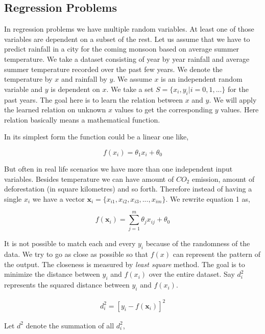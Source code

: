 \documentclass[english]{tktltiki}
\begin{document}
\subsection{Regression Problems}
\label{subsec:reg_prob}

In regression problems we have multiple random variables. At least one of those variables are dependent on a subset of the rest. Let us assume that we have to predict rainfall in a city for the coming monsoon based on average summer temperature. We take a dataset consisting of year by year rainfall and average summer temperature recorded over the past few years. We denote the temperature by $x$ and rainfall by $y$. We assume $x$ is an independent random variable and $y$ is dependent on $x$. We take a set $S = \{x_i, y_i|i = 0, 1, ...\}$ for the past years. The goal here is to learn the relation between $x$ and $y$. We will apply the learned relation on unknown $x$ values to get the corresponding $y$ values. Here relation basically means a mathematical function.

In its simplest form the function could be a linear one like,

\begin{equation}
f(x_i) = \theta_1 x_i + \theta_0
\end{equation}


But often in real life scenarios we have more than one independent input variables. Besides temperature we can have amount of $CO_2$ emission, amount of deforestation (in square kilometres) and so forth. Therefore instead of having a single $x_i$ we have a vector $\mathbf{x}_i = \{x_{i1}, x_{i2}, x_{i3}, ..., x_{im}\}$. We rewrite equation 1 as,

\begin{equation}
f(\mathbf{x}_i) = \sum_{j=1}^m \theta_j x_{ij} + \theta_0
\end{equation}

It is not possible to match each and every $y_i$ because of the randomness of the data. We try to go as close as possible so that $f(x)$ can represent the pattern of the output. The closeness is measured by \textit{least square} method. The goal is to minimize the distance between $y_i$ and $f(x_i)$ over the entire dataset. Say $d^2_i$ represents the squared distance between $y_i$ and $f(x_i)$.

\begin{eqnarray}
d^2_i = [y_i - f(\mathbf{x}_i)]^2
\end{eqnarray}

Let $d^2$ denote the summation of all $d^2_i$,
\end{document}
